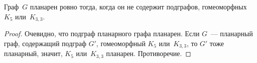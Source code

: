 \begin{theorem}
	Граф~$G$ планарен ровно тогда, когда он не содержит подграфов, гомеоморфных $K_5$ или~$K_{3,3}$.
\end{theorem}
\begin{proof}
	Очевидно, что подграф планарного графа планарен.
	Если $G$~--- планарный граф, содержащий подграф $G'$, гомеоморфный $K_5$ или~$K_{3,3}$, то $G'$ тоже планарный, значит, $K_5$ или~$K_{3,3}$ планарен.
	Противоречие.
\end{proof}